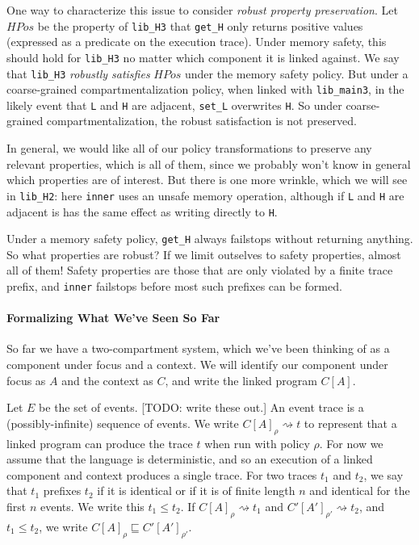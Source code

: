 \documentclass{article}
\begin{document}
One way to characterize this issue to consider {\em robust property preservation}.
Let \(\mathit{HPos}\) be the property of {\tt lib\_H3} that {\tt get\_H} only returns
positive values (expressed as a predicate on the execution trace). Under memory safety,
this should hold for {\tt lib\_H3} no matter which component it is linked against.
We say that {\tt lib\_H3} {\em robustly satisfies} \(\mathit{HPos}\) under the memory safety
policy. But under a coarse-grained compartmentalization policy, when linked with {\tt lib\_main3},
in the likely event that {\tt L} and {\tt H} are adjacent, {\tt set\_L} overwrites
{\tt H}. So under coarse-grained compartmentalization, the robust satisfaction is
not preserved.

In general, we would like all of our policy transformations to preserve any relevant properties,
which is all of them, since we probably won't know in general which properties are of interest.
But there is one more wrinkle, which we will see in {\tt lib\_H2}: here {\tt inner} uses
an unsafe memory operation, although if {\tt L} and {\tt H} are adjacent is has the same
effect as writing directly to {\tt H}.

Under a memory safety policy, {\tt get\_H} always failstops without returning anything.
So what properties are robust? If we limit outselves to safety properties, almost all of them!
Safety properties are those that are only violated by a finite trace prefix, and
{\tt inner} failstops before most such prefixes can be formed.

\paragraph{Formalizing What We've Seen So Far}

So far we have a two-compartment system, which we've been thinking of as a
component under focus and a context.
We will identify our component under focus as \(A\) and the context as \(C\),
and write the linked program \(C[A]\).

Let \(E\) be the set of events. [TODO: write these out.] An event trace is a (possibly-infinite) sequence
of events. We write \(C[A]_{\rho} \rightsquigarrow t\) to represent that a linked program
can produce the trace \(t\) when run with policy \(\rho\). For now we assume that the
language is deterministic, and so an execution of a linked component and context produces
a single trace. For two traces \(t_1\) and \(t_2\), we say that \(t_1\) prefixes \(t_2\)
if it is identical or if it is of finite length \(n\) and identical for the first \(n\)
events. We write this \(t_1 \leq t_2\). If \(C[A]_\rho \rightsquigarrow t_1\) and
\(C'[A']_{\rho'} \rightsquigarrow t_2\), and \(t_1 \leq t_2\), we write
\(C[A]_\rho \sqsubseteq C'[A']_{\rho'}\).
\end{document}
